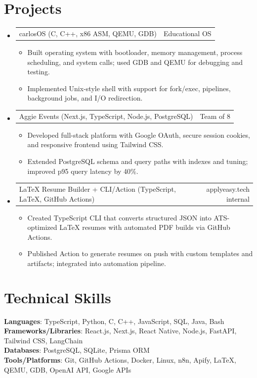 \documentclass[letterpaper,11pt]{article}
\makeatletter
\newcommand{\resumeItem}[1]{
  \item\small{{#1 \vspace{-2pt}}}
}
\newcommand{\resumeProjectHeading}[2]{
    \item
    \begin{tabular*}{0.97\textwidth}{l@{\extracolsep{\fill}}r}
      \small#1 & #2 \\
    \end{tabular*}\vspace{-7pt}
}
\newcommand{\resumeSubHeadingListStart}{\begin{itemize}[leftmargin=0.15in, label={}]}
\newcommand{\resumeSubHeadingListEnd}{\end{itemize}}
\newcommand{\resumeItemListStart}{\begin{itemize}}
\newcommand{\resumeItemListEnd}{\end{itemize}\vspace{-5pt}}
\makeatother
\begin{document}
\section{Projects}
\resumeSubHeadingListStart
  \resumeProjectHeading{carlosOS (C, C++, x86 ASM, QEMU, GDB)}{Educational OS}
    \resumeItemListStart
      \resumeItem{Built operating system with bootloader, memory management, process scheduling, and system calls; used GDB and QEMU for debugging and testing.}
      \resumeItem{Implemented Unix-style shell with support for fork/exec, pipelines, background jobs, and I/O redirection.}
    \resumeItemListEnd

  \resumeProjectHeading{Aggie Events (Next.js, TypeScript, Node.js, PostgreSQL)}{Team of 8}
    \resumeItemListStart
      \resumeItem{Developed full-stack platform with Google OAuth, secure session cookies, and responsive frontend using Tailwind CSS.}
      \resumeItem{Extended PostgreSQL schema and query paths with indexes and tuning; improved p95 query latency by 40\%.}
    \resumeItemListEnd

  \resumeProjectHeading{LaTeX Resume Builder + CLI/Action (TypeScript, LaTeX, GitHub Actions)}{applyeasy.tech internal}
    \resumeItemListStart
      \resumeItem{Created TypeScript CLI that converts structured JSON into ATS-optimized LaTeX resumes with automated PDF builds via GitHub Actions.}
      \resumeItem{Published Action to generate resumes on push with custom templates and artifacts; integrated into automation pipeline.}
    \resumeItemListEnd
\resumeSubHeadingListEnd

\section{Technical Skills}
\begin{itemize}[leftmargin=0.15in, label={}]
  \small{\item{
    \textbf{Languages}{: TypeScript, Python, C, C++, JavaScript, SQL, Java, Bash} \\
    \textbf{Frameworks/Libraries}{: React.js, Next.js, React Native, Node.js, FastAPI, Tailwind CSS, LangChain} \\
    \textbf{Databases}{: PostgreSQL, SQLite, Prisma ORM} \\
    \textbf{Tools/Platforms}{: Git, GitHub Actions, Docker, Linux, n8n, Apify, LaTeX, QEMU, GDB, OpenAI API, Google APIs}
  }}
\end{itemize}
\end{document}
